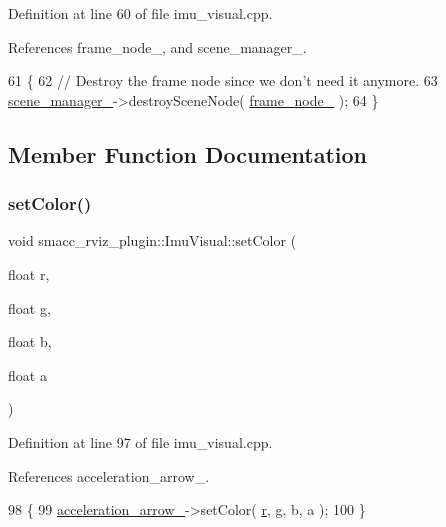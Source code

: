 Definition at line 60 of file imu\+\_\+visual.\+cpp.



References frame\+\_\+node\+\_\+, and scene\+\_\+manager\+\_\+.


\begin{DoxyCode}
61 \{
62   \textcolor{comment}{// Destroy the frame node since we don't need it anymore.}
63   \hyperlink{classsmacc__rviz__plugin_1_1ImuVisual_acef4dba58d14224192bbed7eabbd6cbb}{scene\_manager\_}->destroySceneNode( \hyperlink{classsmacc__rviz__plugin_1_1ImuVisual_ae41316c00ac89e1e0ee0adf62da10841}{frame\_node\_} );
64 \}
\end{DoxyCode}


\subsection{Member Function Documentation}
\mbox{\label{classsmacc__rviz__plugin_1_1ImuVisual_a6b5973fedfb8620c1e1493840ae7c76b}} 
\subsubsection{\texorpdfstring{set\+Color()}{setColor()}}
{\footnotesize\ttfamily void smacc\+\_\+rviz\+\_\+plugin\+::\+Imu\+Visual\+::set\+Color (\begin{DoxyParamCaption}\item[{float}]{r,  }\item[{float}]{g,  }\item[{float}]{b,  }\item[{float}]{a }\end{DoxyParamCaption})}



Definition at line 97 of file imu\+\_\+visual.\+cpp.



References acceleration\+\_\+arrow\+\_\+.


\begin{DoxyCode}
98 \{
99   \hyperlink{classsmacc__rviz__plugin_1_1ImuVisual_abead7d3f3c66b20bba8123a145b121b0}{acceleration\_arrow\_}->setColor( \hyperlink{namespacefake__cube__perception__node_a36e88703ab69fd35065e8a8d9344903e}{r}, g, b, a );
100 \}
\end{DoxyCode}
\mbox{\label{classsmacc__rviz__plugin_1_1ImuVisual_ac308baf22f4bfb15b69b18776d22f181}} 
